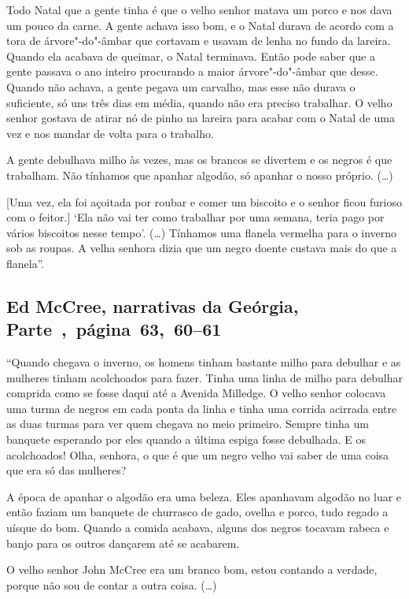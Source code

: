 Todo Natal que a gente tinha é que o velho senhor matava um porco e 
nos dava um pouco da carne. A gente achava isso bom, e o Natal durava de
acordo com a tora de árvore"-do"-âmbar que cortavam e usavam de lenha no fundo
da lareira. Quando ela acabava de queimar, o Natal terminava. Então pode
saber que a gente passava o ano inteiro procurando a maior
árvore"-do"-âmbar que desse. Quando não achava, a gente pegava um
carvalho, mas esse não durava o suficiente, só uns três dias em média,
quando não era preciso trabalhar. O velho senhor gostava de atirar nó de
pinho na lareira para acabar com o Natal de uma vez e nos mandar de
volta para o trabalho.

A gente debulhava milho às vezes, mas os brancos se divertem e os negros
é que trabalham. Não tínhamos que apanhar algodão, só apanhar o nosso
próprio. (\ldots{})

{[}Uma vez, ela foi açoitada por roubar e comer um biscoito e o senhor
ficou furioso com o feitor.{]} `Ela não vai ter como trabalhar por uma
semana, teria pago por vários biscoitos nesse tempo'. (\ldots{})
Tínhamos uma flanela vermelha para o inverno sob as roupas. A velha
senhora dizia que um negro doente custava mais do que a flanela''.

\subsection{Ed McCree, narrativas da Geórgia, Parte~,~página~63,~60--61}
\label{ref186}

``Quando chegava o inverno, os homens tinham bastante milho para
debulhar e as mulheres tinham acolchoados para fazer. Tinha uma linha de
milho para debulhar comprida como se fosse daqui até a Avenida Milledge.
O velho senhor colocava uma turma de negros em cada ponta da linha e
tinha uma corrida acirrada entre as duas turmas para ver quem chegava no
meio primeiro. Sempre tinha um banquete esperando por eles quando a
última espiga fosse debulhada. E os acolchoados! Olha, senhora, o que é
que um negro velho vai saber de uma coisa que era só das mulheres?

A época de apanhar o algodão era uma beleza. Eles apanhavam algodão no
luar e então faziam um banquete de churrasco de gado, ovelha e porco,
tudo regado a uísque do bom. Quando a comida acabava, alguns dos negros
tocavam rabeca e banjo para os outros dançarem até se acabarem.

O velho senhor John McCree era um branco bom, estou contando
a verdade, porque não sou de contar a outra coisa. (\ldots{})

